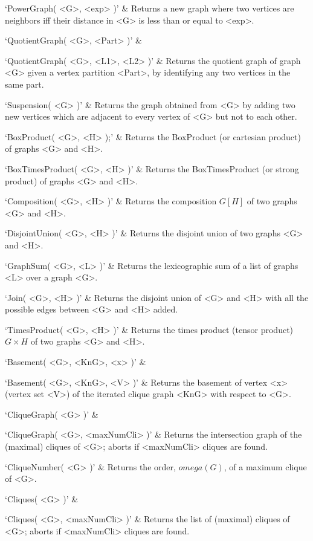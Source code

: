 `PowerGraph( <G>, <exp> )' & 
Returns a new graph where two vertices are neighbors iff their distance in <G> is less than or equal to <exp>.

`QuotientGraph( <G>, <Part> )' & 

`QuotientGraph( <G>, <L1>, <L2> )' & 
Returns the quotient graph of graph <G> given a vertex partition <Part>, by identifying any two vertices in the same part.

`Suspension( <G> )' & 
Returns the graph obtained from  <G> by adding two new vertices which are adjacent to every
vertex of <G> but not to each other.
\enditems


\beginitems
`BoxProduct( <G>, <H> );' & 
Returns the BoxProduct (or cartesian product) of graphs <G> and <H>.

`BoxTimesProduct( <G>, <H> )' & 
Returns the BoxTimesProduct (or strong product) of graphs <G> and <H>.

`Composition( <G>, <H> )' & 
Returns the composition $G[H]$ of two graphs <G> and <H>.

`DisjointUnion( <G>, <H> )' & 
Returns the disjoint union of two graphs <G> and <H>.

`GraphSum( <G>, <L> )' & 
Returns the lexicographic sum of a list of graphs <L> over a graph <G>.

`Join( <G>, <H> )' & 
Returns the disjoint union of <G> and <H> with all the possible edges between <G> and <H> added.

`TimesProduct( <G>, <H> )' & 
Returns  the  times  product (tensor product) $G  \times  H$ of two graphs <G> and <H>.
\enditems


\beginitems
`Basement( <G>, <KnG>, <x> )' & 

`Basement( <G>, <KnG>, <V> )' & 
Returns the basement of vertex <x> (vertex set <V>) of the iterated clique graph <KnG> with respect to <G>.

`CliqueGraph( <G> )' & 

`CliqueGraph( <G>, <maxNumCli> )' & 
Returns the intersection graph of the (maximal) cliques of <G>; aborts if <maxNumCli> cliques are found.

`CliqueNumber( <G> )' & 
Returns the order, $omega(G)$, of a maximum clique of <G>.

`Cliques( <G> )' & 

`Cliques( <G>, <maxNumCli> )' & 
Returns the list of (maximal) cliques of <G>; aborts if <maxNumCli> cliques are found.

